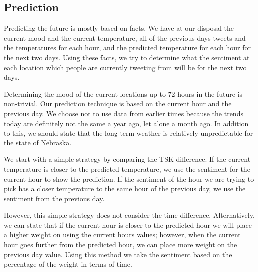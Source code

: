 
\subsection{Prediction}
\label{sec:pred}

Predicting the future is mostly based on facts. We have at our disposal the current mood and the current temperature, all of the previous days tweets and the temperatures for each hour, and the predicted temperature for each hour for the next two days. Using these facts, we try to determine what the sentiment at each location which people are currently tweeting from will be for the next two days.

Determining the mood of the current locations up to 72 hours in the future is non-trivial. Our prediction technique is based on the current hour and the previous day. We choose not to use data from earlier times because the trends today are definitely not the same a year ago, let alone a month ago. In addition to this, we should state that the long-term weather is relatively unpredictable for the state of Nebraska.

We start with a simple strategy by comparing the TSK difference. If the current temperature is closer to the predicted temperature, we use the sentiment for the current hour to show the prediction. If the sentiment of the hour we are trying to pick has a closer temperature to the same hour of the previous day, we use the sentiment from the previous day.

However, this simple strategy does not consider the time difference. Alternatively, we can state that if the current hour is closer to the predicted hour we will place a higher weight on using the current hours values; however, when the current hour goes further from the predicted hour, we can place more weight on the previous day value. %
Using this method we take the sentiment based on the percentage of the weight in terms of time.


